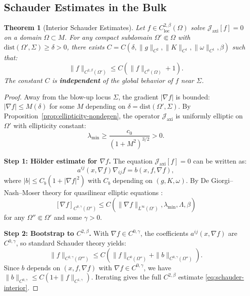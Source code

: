\documentclass[12pt]{article}
\theoremstyle{plain}
\newtheorem{theorem}{Theorem}[section]
\theoremstyle{definition}
\theoremstyle{remark}
\newcommand{\Hoelder}{\beta}
\begin{document}
\subsection{Schauder Estimates in the Bulk}

\begin{theorem}[Interior Schauder Estimates]\label{thm:schauder-interior}
Let $f \in C^{2,\Hoelder}_{\mathrm{loc}}(\Omega)$ solve $\mathcal{J}_{\mathrm{axi}}[f] = 0$ on a domain $\Omega \subset M$. For any compact subdomain $\Omega' \Subset \Omega$ with $\mathrm{dist}(\Omega', \Sigma) \geq \delta > 0$, there exists $C = C(\delta, \|g\|_{C^2}, \|K\|_{C^1}, \|\omega\|_{C^1}, \Hoelder)$ such that:
\begin{equation}\label{eq:schauder-interior}
\|f\|_{C^{2,\Hoelder}(\Omega')} \leq C\left(\|f\|_{C^0(\Omega)} + 1\right).
\end{equation}
The constant $C$ is \textbf{independent} of the global behavior of $f$ near $\Sigma$.
\end{theorem}

\begin{proof}
Away from the blow-up locus $\Sigma$, the gradient $|\nabla f|$ is bounded: $|\nabla f| \leq M(\delta)$ for some $M$ depending on $\delta = \mathrm{dist}(\Omega', \Sigma)$. By Proposition~\ref{prop:ellipticity-nondegen}, the operator $\mathcal{J}_{\mathrm{axi}}$ is uniformly elliptic on $\Omega'$ with ellipticity constant:
\[
\lambda_{\min} \geq \frac{c_0}{(1 + M^2)^{3/2}} > 0.
\]

\textbf{Step 1: H\"older estimate for $\nabla f$.}
The equation $\mathcal{J}_{\mathrm{axi}}[f] = 0$ can be written as:
\[
a^{ij}(x, \nabla f) \nabla_{ij} f = b(x, f, \nabla f),
\]
where $|b| \leq C_b(1 + |\nabla f|^2)$ with $C_b$ depending on $(g, K, \omega)$. By De Giorgi--Nash--Moser theory for quasilinear elliptic equations \cite{serrin1964}:
\[
[\nabla f]_{C^{0,\gamma}(\Omega'')} \leq C(\|\nabla f\|_{L^\infty(\Omega')}, \lambda_{\min}, \Lambda, \Hoelder)
\]
for any $\Omega'' \Subset \Omega'$ and some $\gamma > 0$.

\textbf{Step 2: Bootstrap to $C^{2,\Hoelder}$.}
With $\nabla f \in C^{0,\gamma}$, the coefficients $a^{ij}(x, \nabla f)$ are $C^{0,\gamma}$, so standard Schauder theory \cite{gilbargtrudinger2001} yields:
\[
\|f\|_{C^{2,\gamma}(\Omega''')} \leq C\left(\|f\|_{C^0(\Omega'')} + \|b\|_{C^{0,\gamma}(\Omega'')}\right).
\]
Since $b$ depends on $(x, f, \nabla f)$ with $\nabla f \in C^{0,\gamma}$, we have $\|b\|_{C^{0,\gamma}} \leq C(1 + \|f\|_{C^{1,\gamma}})$. Iterating gives the full $C^{2,\Hoelder}$ estimate \eqref{eq:schauder-interior}.
\end{proof}
\end{document}
